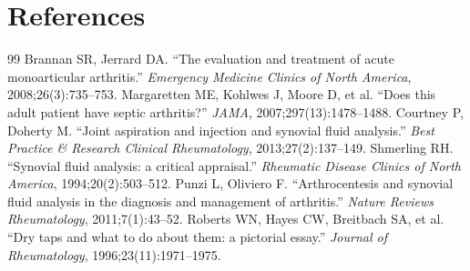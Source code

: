\section*{References}
\begin{thebibliography}{99}
 Brannan SR, Jerrard DA. ``The evaluation and treatment of acute monoarticular arthritis.'' \textit{Emergency Medicine Clinics of North America}, 2008;26(3):735--753.
 Margaretten ME, Kohlwes J, Moore D, et al. ``Does this adult patient have septic arthritis?'' \textit{JAMA}, 2007;297(13):1478--1488.
 Courtney P, Doherty M. ``Joint aspiration and injection and synovial fluid analysis.'' \textit{Best Practice \& Research Clinical Rheumatology}, 2013;27(2):137--149.
 Shmerling RH. ``Synovial fluid analysis: a critical appraisal.'' \textit{Rheumatic Disease Clinics of North America}, 1994;20(2):503--512.
 Punzi L, Oliviero F. ``Arthrocentesis and synovial fluid analysis in the diagnosis and management of arthritis.'' \textit{Nature Reviews Rheumatology}, 2011;7(1):43--52.
 Roberts WN, Hayes CW, Breitbach SA, et al. ``Dry taps and what to do about them: a pictorial essay.'' \textit{Journal of Rheumatology}, 1996;23(11):1971--1975.

\end{thebibliography}
